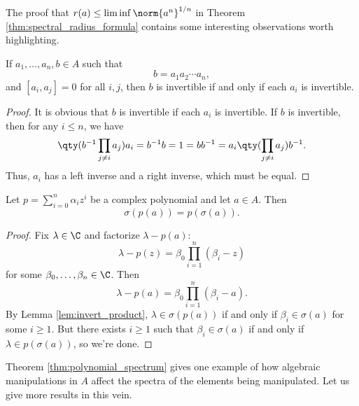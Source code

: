 The proof that $r(a) \leq \liminf \norm{a^n}^{1/n}$ in Theorem \ref{thm:spectral_radius_formula} contains some interesting observations worth highlighting.

\begin{lemma}\label{lem:invert_product}
If $a_1,\ldots, a_n, b \in A$ such that
\begin{equation}
b = a_1 a_2 \cdots a_n,
\end{equation}
and $[a_i, a_j] = 0$ for all $i,j$, then $b$ is invertible if and only if each $a_i$ is invertible.
\end{lemma}

\begin{proof}
It is obvious that $b$ is invertible if each $a_i$ is invertible. If $b$ is invertible, then for any $i\leq n$, we have
\begin{equation}
\qty(b^{-1}\prod_{j \neq i} a_j)a_i = b^{-1}b = 1 =bb^{-1} =  a_i \qty(\prod_{j \neq i} a_j)b^{-1}.
\end{equation}
Thus, $a_i$ has a left inverse and a right inverse, which must be equal.
\end{proof}

\begin{theorem}\label{thm:polynomial_spectrum}
Let $p = \sum_{i=0}^n \alpha_i z^i$ be a complex polynomial and let $a \in A$. Then
\begin{equation}
\sigma(p(a)) = p(\sigma(a)).
\end{equation}
\end{theorem}

\begin{proof}
Fix $\lambda \in \C$ and factorize $\lambda - p(a)$:
\begin{equation}
\lambda - p(z) = \beta_0 \prod_{i=1}^n (\beta_i - z)
\end{equation}
for some $\beta_0,\ldots, \beta_n \in \C$. Then 
\begin{equation}
\lambda - p(a) = \beta_0 \prod_{i=1}^n (\beta_i - a).
\end{equation}
By Lemma \ref{lem:invert_product}, $\lambda \in \sigma(p(a))$ if and only if $\beta_i \in \sigma(a)$ for some $i \geq 1$. But there exists $i \geq 1$ such that $\beta_i \in \sigma(a)$ if and only if $\lambda \in p(\sigma(a))$, so we're done.
\end{proof}


Theorem \ref{thm:polynomial_spectrum} gives one example of how algebraic manipulations in $A$ affect the spectra of the elements being manipulated. Let us give more results in this vein.

